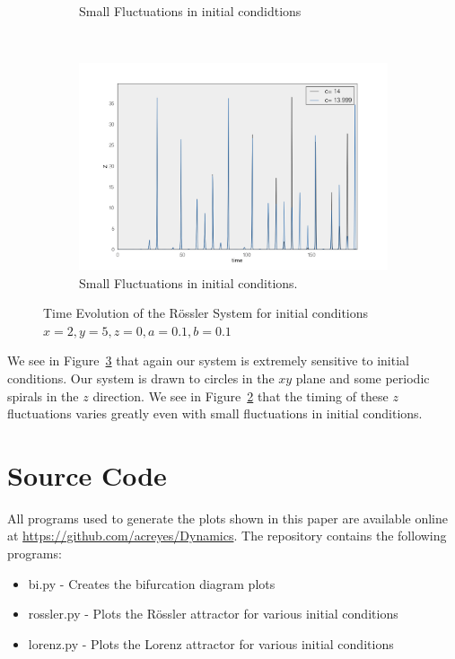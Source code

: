 \documentclass[paper=a4, fontsize=11pt, abstract=on]{scrartcl} %
\numberwithin{equation}{section}
\numberwithin{figure}{section}
\numberwithin{table}{section}
\begin{document}
\begin{figure}
\begin{subfigure}[b]{0.7\textwidth}
                \caption{Small Fluctuations in initial condidtions}
                \label{fig:rosslerb}
        \end{subfigure}
        ~ %
        \begin{subfigure}[b]{0.7\textwidth}
                \includegraphics[width=\textwidth]{rossler2}
                \caption{Small Fluctuations in initial conditions. }
                \label{fig:rosslerc}
        \end{subfigure}
        \caption{Time Evolution of the R\"{o}ssler System for initial
          conditions $x=2,y=5,z=0,a =0.1, b = 0.1$}\label{fig:rossler}
\end{figure}

We see in Figure~\ref{fig:rossler} that again our system is extremely
sensitive to initial conditions. Our system is drawn to circles in the
$xy$ plane and some periodic spirals in the $z$ direction. We see in
Figure~\ref{fig:rosslerc} that the timing of these $z$ fluctuations
varies greatly even with small fluctuations in initial conditions.

\newpage

\appendix

\section{Source Code}
\label{sec:src}



All programs used to generate the plots shown in this paper are available online at
\url{https://github.com/acreyes/Dynamics}. The repository contains the
following programs:
\begin{itemize}
\item bi.py - Creates the bifurcation diagram plots
\item rossler.py - Plots the R\"{o}ssler attractor for various initial
  conditions
\item lorenz.py - Plots the Lorenz attractor for various initial conditions
\end{itemize}
\end{document}
